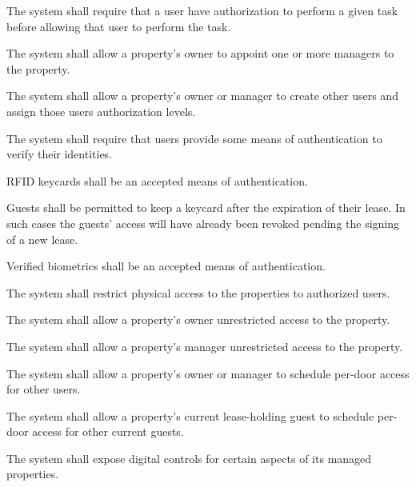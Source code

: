 \documentclass[letter,titlepage,oneside,english]{report}
\begin{document}
\begin{fr}
\item
  The system shall require that a user have authorization to perform a given task before allowing that user to perform the task.
  \begin{fr}
  \item
    The system shall allow a property's owner to appoint one or more managers to the property.
  \item
    The system shall allow a property's owner or manager to create other users and assign those users authorization levels.
  \item
    The system shall require that users provide some means of authentication to verify their identities.
    \begin{fr}
    \item
      RFID keycards shall be an accepted means of authentication.
      \begin{fr}
      \item
        Guests shall be permitted to keep a keycard after the expiration of their lease.
        In such cases the guests' access will have already been revoked pending the signing of a new lease.
      \end{fr}
    \item
      Verified biometrics shall be an accepted means of authentication.
    \end{fr}
  \end{fr}
\item
  The system shall restrict physical access to the properties to authorized users.
  \begin{fr}
  \item
    The system shall allow a property's owner unrestricted access to the property.
  \item
    The system shall allow a property's manager unrestricted access to the property.
  \item
    The system shall allow a property's owner or manager to schedule per-door access for other users.
  \item
    The system shall allow a property's current lease-holding guest to schedule per-door access for other current guests.
  \end{fr}
\item\label{fr:controls}
  The system shall expose digital controls for certain aspects of its managed properties.
  \begin{fr}
  \item\label{fr:customizable}

\end{fr}
\end{fr}
\end{document}
